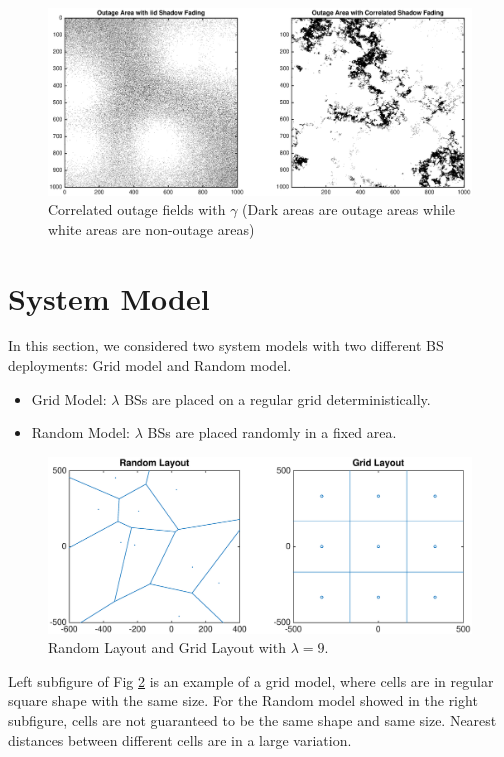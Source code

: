  \begin{figure}
 \centering
 \includegraphics[width=14cm]{outageArea.eps}
 \caption{Correlated outage fields with $\gamma$ (Dark areas are outage areas while white areas are non-outage areas)}
 \label{4:outagefie}
 \end{figure}


 \section{System Model}
 \label{4:SystemModel}
 In this section, we considered two system models with two different BS deployments: Grid model and Random model.
 \begin{itemize}
 \item Grid Model: $\lambda$ BSs are placed on a regular grid deterministically.
 \item Random Model: $\lambda$ BSs are placed randomly in a fixed area.
 \end{itemize}
 \begin{figure}
 \centering
 \includegraphics[width=14cm]{systemLayout.eps}
 \caption{Random Layout and Grid Layout with $\lambda = 9$.}
 \label{4:RandomLayout}
 \end{figure}
 Left subfigure of Fig \ref{4:RandomLayout} is an example of a grid model, where cells are in regular square shape with the same size. For the Random model showed in the right subfigure, cells are not guaranteed to be the same shape and same size. Nearest distances between different cells are in a large variation. 


